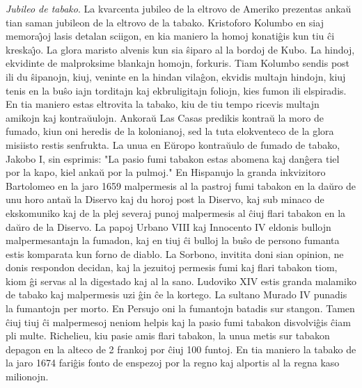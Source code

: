 \emph{Jubileo de tabako}. La kvarcenta jubileo de la eltrovo de
Ameriko prezentas anka\u u tian saman jubileon de la eltrovo de la
tabako. Kristoforo Kolumbo en siaj memora\^{\j}oj lasis detalan
sciigon, en kia maniero la homoj konati\^gis kun tiu \^ci
kreska\^{\j}o. La glora maristo alvenis kun sia \^siparo al la
bordoj de Kubo. La hindoj, ekvidinte de malproksime blankajn homojn,
forkuris. Tiam Kolumbo sendis post ili du \^sipanojn, kiuj, veninte
en la hindan vila\^gon, ekvidis multajn hindojn, kiuj tenis en la
bu\^so iajn torditajn kaj ekbruligitajn foliojn, kies fumon ili
elspiradis. En tia maniero estas eltrovita la tabako, kiu de tiu
tempo ricevis multajn amikojn kaj kontra\u uulojn. Ankora\u u Las
Casas predikis kontra\u u la moro de fumado, kiun oni heredis de la
kolonianoj, sed la tuta elokventeco de la glora misiisto restis
senfrukta. La unua en E\u uropo kontra\u uulo de fumado de tabako,
Jakobo I, sin esprimis: "La pasio fumi tabakon estas abomena kaj
dan\^gera tiel por la kapo, kiel anka\u u por la pulmoj." En
Hispanujo la granda inkvizitoro Bartolomeo en la jaro 1659
malpermesis al la pastroj fumi tabakon en la da\u uro de unu horo
anta\u u la Diservo kaj du horoj post la Diservo, kaj sub minaco de
ekskomuniko kaj de la plej severaj punoj malpermesis al \^ciuj flari
tabakon en la da\u uro de la Diservo. La papoj Urbano VIII kaj
Innocento IV eldonis bullojn malpermesantajn la fumadon, kaj en tiuj
\^ci bulloj la bu\^so de persono fumanta estis komparata kun forno
de diablo. La Sorbono, invitita doni sian opinion, ne donis
respondon decidan, kaj la jezuitoj permesis fumi kaj flari tabakon
tiom, kiom \^gi servas al la digestado kaj al la sano. Ludoviko XIV
estis granda malamiko de tabako kaj malpermesis uzi \^gin \^ce la
kortego. La sultano Murado IV punadis la fumantojn per morto. En
Persujo oni la fumantojn batadis sur stangon. Tamen \^ciuj tiuj \^ci
malpermesoj neniom helpis kaj la pasio fumi tabakon disvolvi\^gis
\^ciam pli multe. Richelieu, kiu pasie amis flari tabakon, la unua
metis sur tabakon depagon en la alteco de 2 frankoj por \^ciuj 100
funtoj. En tia maniero la tabako de la jaro 1674 fari\^gis fonto de
enspezoj por la regno kaj alportis al la regna kaso milionojn.

